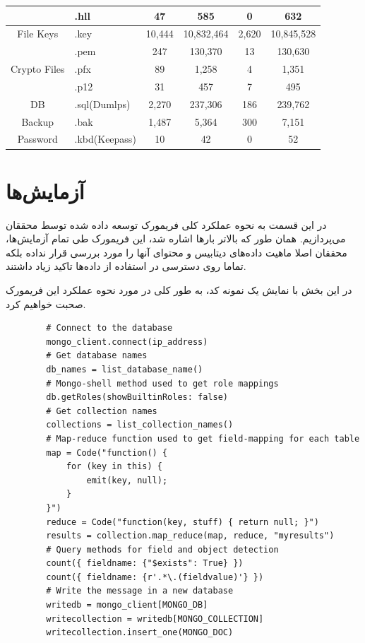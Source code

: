 \documentclass[10pt, a4paper]{article}
\begin{document}
\begin{LTR}
\begin{table}[!h]
{\begin{tabular}{|c|l|ccc|c|}
                & .hll & 47 & 585 & 0 & 632 \\ \hline
                File Keys & .key & 10,444 & 10,832,464 & 2,620 & 10,845,528 \\ \hline
                \multirow{3}{*}{Crypto Files}
                & .pem & 247 & 130,370 & 13 & 130,630 \\
                & .pfx & 89 & 1,258 & 4 & 1,351  \\
                & .p12 & 31 & 457 & 7 & 495 \\ \hline
                DB & .sql(Dumlps) & 2,270 & 237,306 & 186 & 239,762 \\ \hline
                Backup & .bak & 1,487 & 5,364 & 300 & 7,151 \\ \hline
                Password & .kbd(Keepass) & 10 & 42 & 0 & 52 \\ \hline
            \end{tabular}
        }
    \end{table}
\end{LTR}

\newpage

\section{آزمایش‌ها}

در‌ این قسمت به نحوه عملکرد کلی فریمورک توسعه داده شده توسط محققان می‌پردازیم.
همان طور که بالاتر بارها اشاره شد، این فریمورک طی تمام آزمایش‌ها، محققان اصلا
ماهیت داده‌های دیتابیس و محتوای آنها را مورد بررسی قرار نداده بلکه تماما روی
دسترسی در استفاده از داده‌ها تاکید زیاد داشتند.

در این بخش با نمایش یک نمونه کد، به طور کلی در مورد نحوه عملکرد این فریمورک صحبت
خواهیم کرد.

\begin{LTR}
    \begin{lstlisting}
        # Connect to the database
        mongo_client.connect(ip_address)
        # Get database names
        db_names = list_database_name()
        # Mongo-shell method used to get role mappings
        db.getRoles(showBuiltinRoles: false)
        # Get collection names
        collections = list_collection_names()
        # Map-reduce function used to get field-mapping for each table
        map = Code("function() {
            for (key in this) {
                emit(key, null);
            }
        }")
        reduce = Code("function(key, stuff) { return null; }")
        results = collection.map_reduce(map, reduce, "myresults")
        # Query methods for field and object detection
        count({ fieldname: {"$exists": True} })
        count({ fieldname: {r'.*\.(fieldvalue)'} })
        # Write the message in a new database
        writedb = mongo_client[MONGO_DB]
        writecollection = writedb[MONGO_COLLECTION]
        writecollection.insert_one(MONGO_DOC)
    \end{lstlisting}
\end{LTR}
\end{document}
